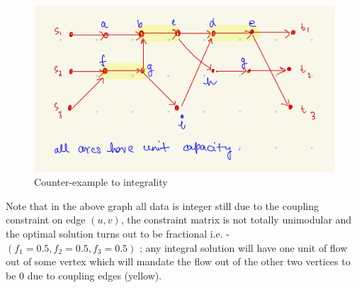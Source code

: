\documentclass{article}
\numberwithin{equation}{section}
\begin{document}
\begin{figure}[H]
    \centering
    \includegraphics[width = 0.50\linewidth]{resources/HW2Q6.jpeg}
    \caption{Counter-example to integrality}
    \label{fig:enter-label}
\end{figure}
\noindent Note that in the above graph all data is integer still due to the coupling constraint on edge $(u, v)$, the constraint matrix is not totally unimodular and the optimal solution turns out to be fractional i.e. - $(f_1 = 0.5, f_2 = 0.5, f_3 = 0.5)$ ; any integral solution will have one unit of flow out of some vertex which will mandate the flow out of the other two vertices to be 0 due to coupling edges (yellow).
\newpage
\end{document}
